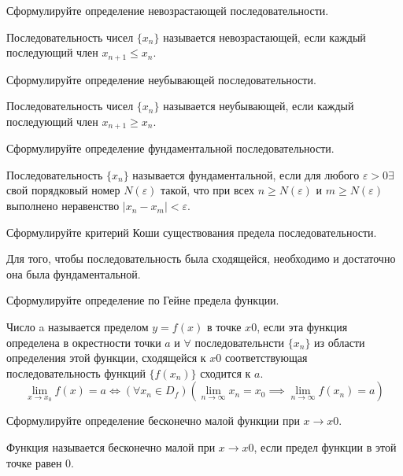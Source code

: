 \begin{question}
  Сформулируйте определение невозрастающей последовательности.
\end{question}
\begin{answer}
  Последовательность чисел $\{x_{n}\}$ называется невозрастающей, если каждый последующий член $x_{n+1} \le x_{n}$.
\end{answer}

\begin{question}
  Сформулируйте определение неубывающей последовательности.
\end{question}
\begin{answer}
  Последовательность чисел $\{x_{n}\}$ называется неубывающей, если каждый последующий член $x_{n+1} \ge x_{n}$.
\end{answer}

\begin{question}
  Сформулируйте определение фундаментальной последовательности.
\end{question}
\begin{answer}
  Последовательность $\{x_{n}\}$ называется фундаментальной, если для любого $ε > 0 ∃$ свой порядковый номер $N(\varepsilon)$ такой, что при всех $n \ge N(\varepsilon)$ и $m \ge N(ε)$ выполнено неравенство $|x_{n} − x_{m}| < ε$. 
\end{answer}

\begin{question}
  Сформулируйте критерий Коши существования предела последовательности.
\end{question}
\begin{answer}
  Для того, чтобы последовательность была сходящейся, необходимо и достаточно она была фундаментальной.
\end{answer}

\begin{question}
  Сформулируйте определение по Гейне предела функции.
\end{question}
\begin{answer}
  Число a называется пределом $y=f(x)$ в точке $x0$, если эта функция определена в окрестности точки $a$ и $∀$ последовательнсти $\{x_{n}\}$ из области определения этой функции, сходящейся к $x0$ соответствующая последовательность функций $\{f(x_{n})\}$ сходится к $a$. \[
    \lim_{x \to x_0} f(x) = a \iff (\forall x_{n} \in D_f)(\lim_{n \to \infty} x_{n} = x_{0} \implies \lim_{n \to \infty} f(x_{n}) = a)
\] 
\end{answer}

\begin{question}
  Сформулируйте определение бесконечно малой функции при $x \to x0$. 
\end{question}
\begin{answer}
  Функция называется бесконечно малой при $x \to x0$, если предел функции в этой точке равен 0.
\end{answer}

